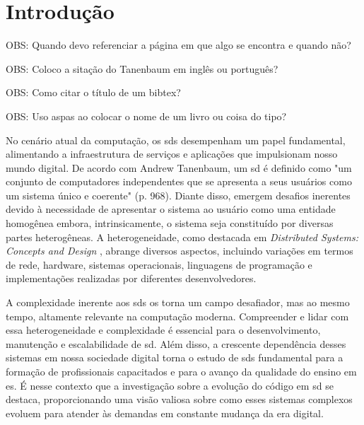 
\chapter{Introdução}\label{cap:introducao}
OBS: Quando devo referenciar a página em que algo se encontra e quando não?

OBS: Coloco a sitação do Tanenbaum em inglês ou português?

OBS: Como citar o título de um bibtex?

OBS: Uso aspas ao colocar o nome de um livro ou coisa do tipo?

No cenário atual da computação, os \gls{sds} desempenham um papel fundamental, alimentando a infraestrutura de serviços e aplicações que impulsionam nosso mundo digital. De acordo com Andrew Tanenbaum, um \gls{sd} é definido como "um conjunto de computadores independentes que se apresenta a seus usuários como um sistema único e coerente" \cite{TanenbaumDistributedSystemsThirdEdition}(p. 968). Diante disso, emergem desafios inerentes devido à necessidade de apresentar o sistema ao usuário como uma entidade homogênea embora, intrinsicamente, o sistema seja constituído por diversas partes heterogêneas. A heterogeneidade, como destacada em \textit{Distributed Systems: Concepts and Design} \cite{DistributedSystemsCoulouris}, abrange diversos aspectos, incluindo variações em termos de rede, hardware, sistemas operacionais, linguagens de programação e implementações realizadas por diferentes desenvolvedores.

A complexidade inerente aos \gls{sds} os torna um campo desafiador, mas ao mesmo tempo, altamente relevante na computação moderna. Compreender e lidar com essa heterogeneidade e complexidade é essencial para o desenvolvimento, manutenção e escalabilidade de \gls{sd}. Além disso, a crescente dependência desses sistemas em nossa sociedade digital torna o estudo de \gls{sds} fundamental para a formação de profissionais capacitados e para o avanço da qualidade do ensino em \gls{es}. É nesse contexto que a investigação sobre a evolução do código em \gls{sd} se destaca, proporcionando uma visão valiosa sobre como esses sistemas complexos evoluem para atender às demandas em constante mudança da era digital.

